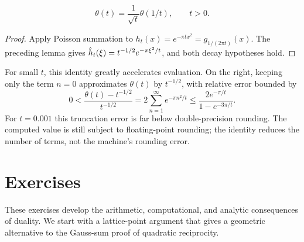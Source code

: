 \begin{thm}
\begin{equation}
\label{eq-id-jacobi}
 \theta(t)=\frac1{\sqrt t}\theta(1/t),\qquad t>0.
\end{equation}
\end{thm}
\begin{proof}
Apply Poisson summation to $h_t(x)=e^{-\pi t x^2}=g_{1/(2\pi t)}(x)$.
The preceding lemma gives
$\hat{h}_t(\xi)=t^{-1/2}e^{-\pi\xi^2/t}$, and both decay hypotheses hold.
\end{proof}
For small $t$, this identity greatly accelerates evaluation. On the right,
keeping only the term $n=0$ approximates $\theta(t)$ by $t^{-1/2}$, with
relative error bounded by
\[
 0<\frac{\theta(t)-t^{-1/2}}{t^{-1/2}}
 =2\sum_{n=1}^{\infty}e^{-\pi n^2/t}
 \leq\frac{2e^{-\pi/t}}{1-e^{-3\pi/t}}.
\]
For $t=0.001$ this truncation error is far below double-precision rounding.
The computed value is still subject to floating-point rounding; the identity
reduces the number of terms, not the machine's rounding error.

\section{Exercises}

These exercises develop the arithmetic, computational, and analytic
consequences of duality. We start with a lattice-point argument that gives a
geometric alternative to the Gauss-sum proof of quadratic reciprocity.

